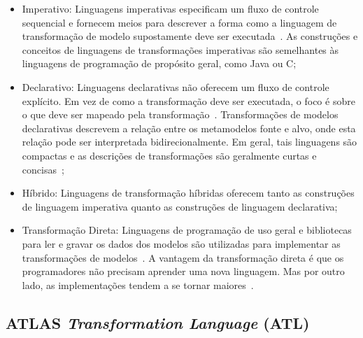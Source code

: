 \begin{itemize}
	\item Imperativo: Linguagens imperativas especificam um fluxo de controle sequencial e fornecem meios para descrever a forma como a linguagem de transformação de modelo supostamente deve ser executada~\cite{Mens_2006}. As construções e conceitos de linguagens de transformações imperativas são semelhantes às linguagens de programação de propósito geral, como Java ou C;
	\item Declarativo: Linguagens declarativas não oferecem um fluxo de controle explícito. Em vez de como a transformação deve ser executada, o foco é sobre o que deve ser mapeado pela transformação~\cite{Mens_2006}. Transformações de modelos declarativas descrevem a relação entre os metamodelos fonte e alvo, onde esta relação pode ser interpretada bidirecionalmente. Em geral, tais linguagens são compactas e as descrições de transformações são geralmente curtas e concisas~\cite{Biehl_2010, Mens_2006};
	\item Híbrido: Linguagens de transformação híbridas oferecem tanto as construções de linguagem imperativa quanto as construções de linguagem declarativa;
	\item Transformação Direta: Linguagens de programação de uso geral e bibliotecas para ler e gravar os dados dos modelos são utilizadas para implementar as transformações de modelos~\cite{transformation_huber}. A vantagem da transformação direta é que os programadores não precisam aprender uma nova linguagem. Mas por outro lado, as implementações tendem a se tornar maiores~\cite{Biehl_2010}.
\end{itemize}



\subsection{ATLAS \emph{Transformation Language} (ATL)} %
\label{sub:atl_transformation_language}

